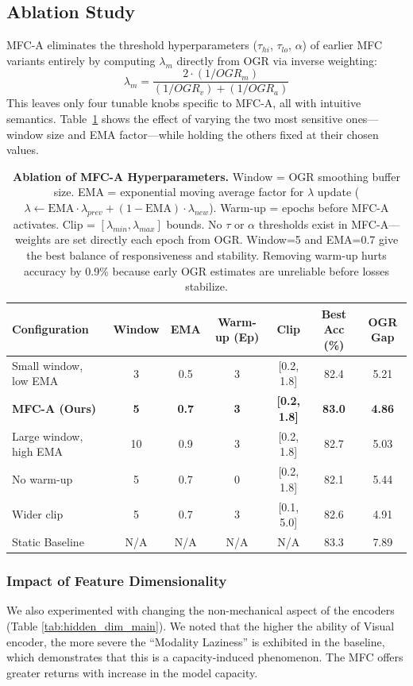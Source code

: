 \documentclass[10pt, twocolumn, letterpaper]{article}
\begin{document}
\subsection{Ablation Study}
MFC-A eliminates the threshold hyperparameters ($\tau_{hi}$, $\tau_{lo}$, $\alpha$) of earlier MFC variants entirely by computing $\lambda_m$ directly from OGR via inverse weighting:
\[
\lambda_m = \frac{2 \cdot (1/OGR_m)}{(1/OGR_v) + (1/OGR_a)}
\]
This leaves only four tunable knobs specific to MFC-A, all with intuitive semantics. Table~\ref{tab:ablation} shows the effect of varying the two most sensitive ones---window size and EMA factor---while holding the others fixed at their chosen values.

\begin{table}[t]
\centering
\begin{tabular}{@{}lcccccc@{}}
\toprule
\textbf{Configuration} & \textbf{Window} & \textbf{EMA} & \textbf{Warm-up (Ep)} & \textbf{Clip} & \textbf{Best Acc (\%)} & \textbf{OGR Gap} \\ \midrule
Small window, low EMA  & 3  & 0.5 & 3 & [0.2, 1.8] & 82.4 & 5.21 \\
\textbf{MFC-A (Ours)}  & \textbf{5} & \textbf{0.7} & \textbf{3} & \textbf{[0.2, 1.8]} & \textbf{83.0} & \textbf{4.86} \\
Large window, high EMA & 10 & 0.9 & 3 & [0.2, 1.8] & 82.7 & 5.03 \\
No warm-up             & 5  & 0.7 & 0 & [0.2, 1.8] & 82.1 & 5.44 \\
Wider clip             & 5  & 0.7 & 3 & [0.1, 5.0] & 82.6 & 4.91 \\
Static Baseline        & N/A & N/A & N/A & N/A & 83.3 & 7.89 \\ \bottomrule
\end{tabular}
\caption{\textbf{Ablation of MFC-A Hyperparameters.} Window = OGR smoothing buffer size. EMA = exponential moving average factor for $\lambda$ update ($\lambda \leftarrow \text{EMA} \cdot \lambda_{prev} + (1-\text{EMA}) \cdot \lambda_{new}$). Warm-up = epochs before MFC-A activates. Clip = $[\lambda_{min}, \lambda_{max}]$ bounds. No $\tau$ or $\alpha$ thresholds exist in MFC-A---weights are set directly each epoch from OGR. Window=5 and EMA=0.7 give the best balance of responsiveness and stability. Removing warm-up hurts accuracy by 0.9\% because early OGR estimates are unreliable before losses stabilize.}
\label{tab:ablation}
\end{table}

\subsubsection{Impact of Feature Dimensionality}
We also experimented with changing the non-mechanical aspect of the encoders (Table \ref{tab:hidden_dim_main}). We noted that the higher the ability of Visual encoder, the more severe the ``Modality Laziness'' is exhibited in the baseline, which demonstrates that this is a capacity-induced phenomenon. The MFC offers greater returns with increase in the model capacity.
\end{document}

